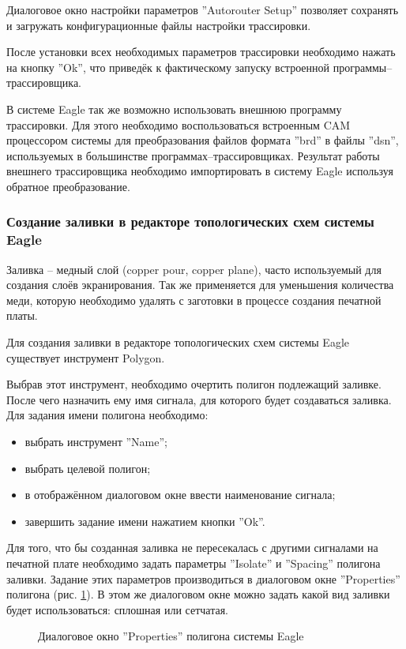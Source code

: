 Диалоговое окно настройки параметров ''Autorouter Setup'' позволяет сохранять и загружать
конфигурационные файлы настройки трассировки.

После установки всех необходимых параметров трассировки необходимо нажать на кнопку
''Ok'', что приведёк к фактическому запуску встроенной программы--трассировщика.

В системе Eagle так же возможно использовать внешнюю программу трассировки.
Для этого необходимо воспользоваться встроенным CAM процессором системы для
преобразования файлов формата ''brd'' в файлы ''dsn'', используемых в большинстве
программах--трассировщиках. Результат работы внешнего трассировщика необходимо
импортировать в систему Eagle используя обратное преобразование.

\subsubsection{Создание заливки в редакторе топологических схем системы Eagle}
Заливка -- медный слой (copper pour, copper plane), часто используемый для создания
слоёв экранирования. Так же применяется для уменьшения количества меди, которую
необходимо удалять с заготовки в процессе создания печатной платы.

Для создания заливки в редакторе топологических схем системы Eagle существует
инструмент Polygon.

Выбрав этот инструмент, необходимо очертить полигон подлежащий заливке. После чего
назначить ему имя сигнала, для которого будет создаваться заливка. Для задания имени
полигона необходимо:
\begin{itemize}
	\item{} выбрать инструмент ''Name'';
	\item{} выбрать целевой полигон;
	\item{} в отображённом диалоговом окне ввести наименование сигнала;
	\item{} завершить задание имени нажатием кнопки ''Ok''.
\end{itemize}
Для того, что бы созданная заливка не пересекалась с другими сигналами на печатной
плате необходимо задать параметры ''Isolate'' и ''Spacing'' полигона заливки. Задание
этих параметров производиться в диалоговом окне ''Properties''
полигона (рис. \ref{img:polyProperty}). В этом же диалоговом окне можно задать какой вид
заливки будет использоваться: сплошная или сетчатая.
\begin{figure}[h]
	\caption{Диалоговое окно ''Properties'' полигона системы Eagle}
	\label{img:polyProperty}
\end{figure}
